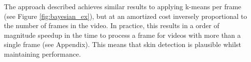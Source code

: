 \noindent
The approach described achieves similar results to applying k-means per frame (see Figure \ref{fig:bayesian_ex}), but at an amortized cost 
inversely proportional to the number of frames in the video. In practice, this results in a order of magnitude speedup in the time to process a frame
for videos with more than a single frame (see Appendix). This means that skin detection is plausible whilst maintaining performance.



 

















